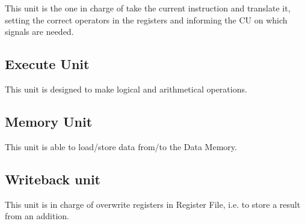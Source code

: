 This unit is the one in charge of take the current instruction and translate it, setting the correct operators in the registers and informing the 
CU on which signals are needed.

\subsection{Execute Unit}

This unit is designed to make logical and arithmetical operations. 
 
\subsection{Memory Unit}

This unit is able to load/store data from/to the Data Memory.

\subsection{Writeback unit}

This unit is in charge of overwrite registers in Register File, i.e. to store a result from an addition.